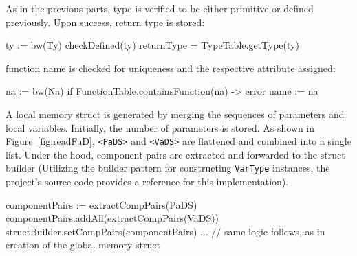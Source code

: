 As in the previous parts, type is verified to be either primitive or defined previously. Upon success, return
type is stored:
\begin{codeblock}
ty := bw(Ty)
checkDefined(ty)
returnType = TypeTable.getType(ty)
\end{codeblock}
function name is checked for uniqueness and the respective attribute assigned:
\begin{codeblock}
na := bw(Na)
if FunctionTable.containsFunction(na) -> { error }
name := na
\end{codeblock}
A local memory struct is generated by merging the sequences of parameters and local variables.
Initially, the number of parameters is stored. As shown in Figure~\ref{fig:readFuD},
\verb+<PaDS>+ and \verb+<VaDS>+ are flattened and combined into a single list. Under the hood, component pairs
are extracted and forwarded to the struct builder (Utilizing the builder pattern for constructing \verb+VarType+ instances,
the project's source code provides a reference for this implementation).
\begin{codeblock}
componentPairs := extractCompPairs(PaDS)
componentPairs.addAll(extractCompPairs(VaDS))
structBuilder.setCompPairs(componentPairs)
... // same logic follows, as in creation of the global memory struct
\end{codeblock}
